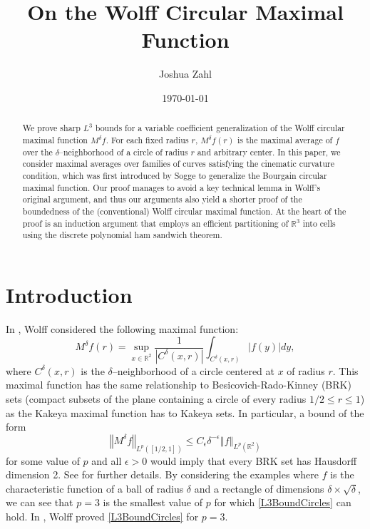 \documentclass[reqno]{amsart}
\theoremstyle{definition}
\theoremstyle{remark}
\theoremstyle{remark}
\newcommand{\norm}[1]{\left\Vert#1\right\Vert}
\newcommand{\RR}{\mathbb{R}}
\begin{document}
\title{On the Wolff Circular Maximal Function}
\author[J.~Zahl]{Joshua Zahl}%
\address{Department of Mathematics, UCLA, Los Angeles CA 90095-1555, USA}
\date{\today}
%
%
\begin{abstract}%
We prove sharp $L^3$ bounds for a variable coefficient generalization of the Wolff circular maximal function $M^\delta f$. For each fixed radius $r$, $M^\delta f(r)$ is the maximal average of $f$ over the $\delta$--neighborhood of a circle of radius $r$ and arbitrary center. In this paper, we consider maximal averages over families of curves satisfying the cinematic curvature condition, which was first introduced by Sogge to generalize the Bourgain circular maximal function. Our proof manages to avoid a key technical lemma in Wolff's original argument, and thus our arguments also yield a shorter proof of the boundedness of the (conventional) Wolff circular maximal function. At the heart of the proof is an induction argument that employs an efficient partitioning of $\mathbb{R}^3$ into cells using the discrete polynomial ham sandwich theorem.
\end{abstract}%

%
\maketitle
\section{Introduction}
In \cite{Wolff1}, Wolff considered the following maximal function:
\begin{equation}\label{WolffCircMaxmlFnCircles}
M^\delta f(r)=\sup_{x\in\RR^2}\frac{1}{|C^\delta(x,r)|}\int_{C^{\delta}(x,r)}|f(y)|dy,
\end{equation}
where $C^{\delta}(x,r)$ is the $\delta$--neighborhood of a circle centered at $x$ of radius $r$. This maximal function has the same relationship to Besicovich-Rado-Kinney (BRK) sets (compact subsets of the plane containing a circle of every radius $1/2\leq r\leq 1$) as the Kakeya maximal function has to Kakeya sets. In particular, a bound of the form
\begin{equation}\label{L3BoundCircles}
\norm{M^\delta f}_{L^p([1/2,1])}\leq C_\epsilon\delta^{-\epsilon}\norm{f}_{L^p(\RR^2)}
\end{equation}
for some value of $p$ and all $\epsilon>0$ would imply that every BRK set has Hausdorff dimension 2. See \cite{Wolff2} for further details. By considering the examples where $f$ is the characteristic function of a ball of radius $\delta$ and a rectangle of dimensions $\delta\times\sqrt\delta$, we can see that $p=3$ is the smallest value of $p$ for which \eqref{L3BoundCircles} can hold. In \cite{Wolff1}, Wolff proved \eqref{L3BoundCircles} for $p=3$.
\end{document}

